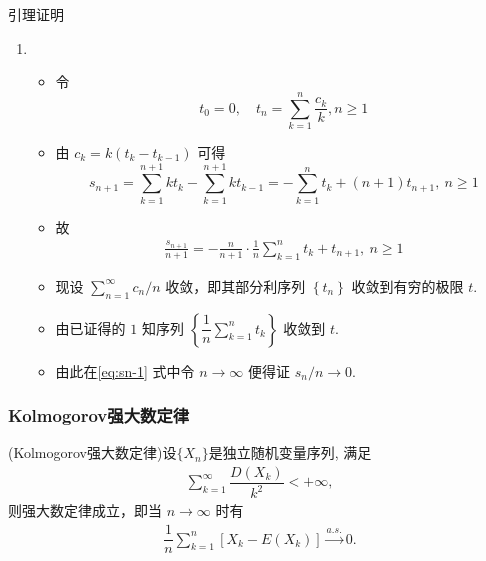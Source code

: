 \begin{frame}{引理证明}
\begin{enumerate}[3.]
	\item \begin{itemize}
		\item 令
		\[
		t_{0}=0, \quad t_{n}=\sum_{k=1}^{n} \frac{c_{k}}{k},  n \geq 1
		\]

		\item 由 $c_{k}=k\left(t_{k}-t_{k-1}\right)$ 可得
		\[
		s_{n+1}=\sum_{k=1}^{n+1} k t_{k}-\sum_{k=1}^{n+1} k t_{k-1}=-\sum_{k=1}^{n} t_{k}+(n+1) t_{n+1},\  n \geq 1
		\]
		\item 故
		\begin{align}\label{eq:sn-1}
			\frac{s_{n+1}}{n+1}=-\frac{n}{n+1} \cdot \frac{1}{n} \sum_{k=1}^{n} t_{k}+t_{n+1},\  n \geq 1
		\end{align}

		\item 现设 $\sum_{n=1}^{\infty} c_{n} / n$ 收敛，即其部分利序列 $\left\{t_{n}\right\}$ 收敛到有穷的极限 $t$.
		\item 由已证得的 $1$ 知序列 $\left\{\dfrac{1}{n} \sum_{k=1}^{n} t_{k}\right\}$ 收敛到 $t$.
		\item 由此在\eqref{eq:sn-1} 式中令 $n \rightarrow \infty$ 便得证 $s_{n} / n \rightarrow 0$. %
	\end{itemize}
\end{enumerate}

\end{frame}




\begin{frame}
	\frametitle{Kolmogorov强大数定律}

	\begin{thm}
		(Kolmogorov强大数定律)设$\{X_n\}$是独立随机变量序列, 满足
		\begin{eqnarray}\label{eq:kllc}
			\sum_{k=1}^\infty\dfrac{D(X_k)}{k^2}<+\infty,
		\end{eqnarray}
		则强大数定律成立，即当 $n\rightarrow\infty$ 时有
		\begin{eqnarray*}
			\dfrac{1}{n}\sum_{k=1}^n[X_k-E(X_k)]\stackrel{a.s.}{\rightarrow}0.\end{eqnarray*}

	\end{thm}





\end{frame}

